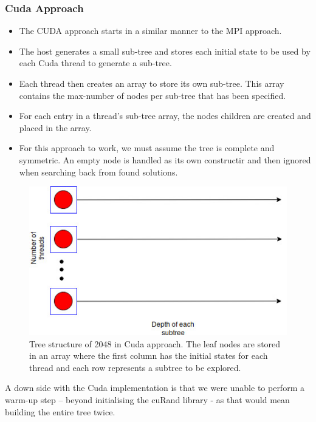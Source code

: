 \documentclass[a4paper]{article}
\begin{document}
\subsubsection{Cuda Approach}
	\begin{itemize}
		\item The CUDA approach starts in a similar manner to the MPI approach.
		\item The host generates a small sub-tree and stores each initial state to be used by each Cuda thread to generate a sub-tree.
		\item Each thread then creates an array to store its own sub-tree. This array contains the max-number of nodes per sub-tree that has been specified.
		\item For each entry in a thread's sub-tree array, the nodes children are created and placed in the array.
		\item For this approach to work, we must assume the tree is complete and symmetric. An empty node is handled as its own constructir and then ignored when searching back from found solutions.
	\end{itemize}


\begin{figure}[H]
	\centering
	\includegraphics[width=1.0\textwidth,scale=1.0]{images/tree_cuda}
	\caption{Tree structure of 2048 in Cuda approach. The leaf nodes are stored in an array where the first column has the initial states for each thread and each row represents a subtree to be explored.}
\end{figure}

\noindent A down side with the Cuda implementation is that we were unable to perform a warm-up step – beyond initialising the cuRand library - as that would mean building the entire tree twice.
\end{document}
